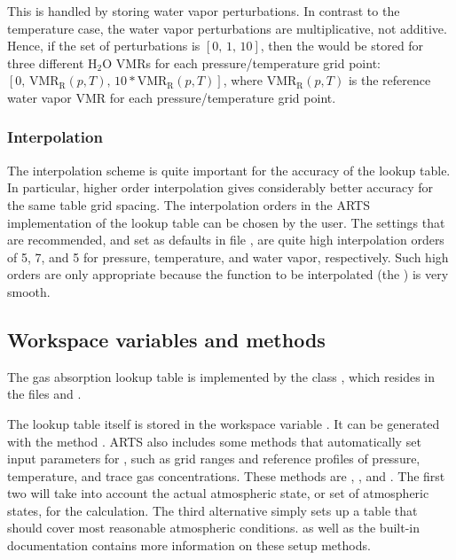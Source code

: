 This is handled by storing water vapor perturbations.  In contrast to
the temperature case, the water vapor perturbations are
multiplicative, not additive.  Hence, if the set of perturbations is
$[0,\, 1,\, 10]$, then the  would be stored for three
different H$_2$O VMRs for each pressure/temperature grid point: $[0,\,
\mathrm{VMR_R}(p,T),\, 10*\mathrm{VMR_R}(p,T)]$, where
$\mathrm{VMR_R}(p,T)$ is the reference water vapor VMR for each
pressure/temperature grid point.

\subsubsection{Interpolation}

The interpolation scheme is quite important for the accuracy of the
lookup table.  In particular, higher order interpolation gives
considerably better accuracy for the same table grid spacing.  The
interpolation orders in the ARTS implementation of the lookup table
can be chosen by the user.  The settings that are recommended, and set
as defaults in file , are quite high
interpolation orders of 5, 7, and 5 for pressure, temperature, and
water vapor, respectively.  Such high orders are only appropriate
because the function to be interpolated (the ) is very smooth.

\subsection{Workspace variables and methods}

The gas absorption lookup table is implemented by the class
, which resides in the files
 and .

The lookup table itself is stored in the workspace variable
.  It can be generated with the method
.  ARTS also includes some methods that
automatically set input parameters for ,
such as grid ranges and reference profiles of pressure, temperature,
and trace gas concentrations.  These methods are
, , and
.  The first two will take into account
the actual atmospheric state, or set of atmospheric states, for the
calculation. The third alternative simply sets up a table that should
cover most reasonable atmospheric conditions.
\citet{buehler:absor:11} as well as the built-in documentation contains more
information on these setup methods.


